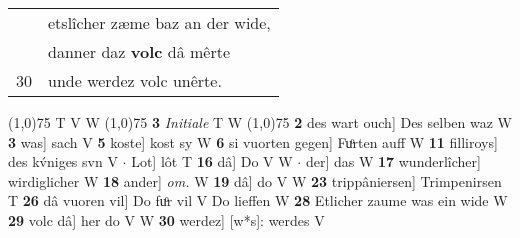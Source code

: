 \documentclass[8pt,a4paper,notitlepage]{article}
\begin{document}
\begin{table}[ht]
\begin{minipage}[t]{0.5\linewidth}
\begin{tabular}{rl}
 & etslîcher zæme baz an der wide,\\ 
 & danner daz \textbf{volc} dâ mêrte\\ 
30 & unde werdez volc unêrte.\\ 
\end{tabular}
\scriptsize
\line(1,0){75} \newline
T V W \newline
\line(1,0){75} \newline
\textbf{3} \textit{Initiale} T W  \newline
\line(1,0){75} \newline
\textbf{2} des wart ouch] Des selben waz W \textbf{3} was] sach V \textbf{5} koste] kost sy W \textbf{6} si vuorten gegen] Fuͦrten auff W \textbf{11} filliroys] des kv́niges svn V  $\cdot$ Lot] lôt T \textbf{16} dâ] Do V W  $\cdot$ der] das W \textbf{17} wunderlîcher] wirdiglicher W \textbf{18} ander] \textit{om.} W \textbf{19} dâ] do V W \textbf{23} trippâniersen] Trimpenirsen T \textbf{26} dâ vuoren vil] Do fuͦr vil V Do lieffen W \textbf{28} Etlicher zaume was ein wide W \textbf{29} volc dâ] her do V W \textbf{30} werdez] [w*s]: werdes V \newline
\end{minipage}
\end{table}
\end{document}
